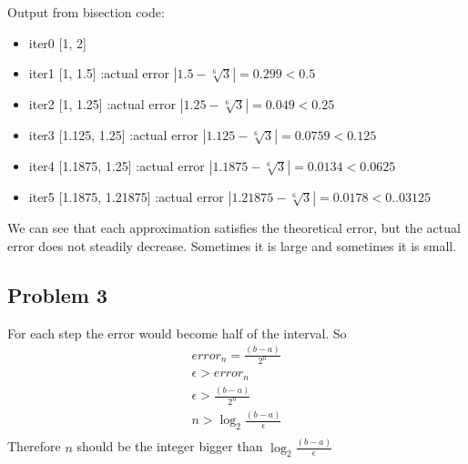 \documentclass{article}
\begin{document}
Output from bisection code: \\
\begin{itemize}
\item iter0 [1,	2] \\
\item iter1 [1,	1.5]   		:actual error $ |1.5-\sqrt[6]{3}|=0.299< 0.5$ \\
\item iter2 [1,	1.25]			:actual error $ |1.25-\sqrt[6]{3}|=0.049< 0.25$ \\
\item iter3 [1.125,	1.25]		:actual error $ |1.125-\sqrt[6]{3}|=0.0759< 0.125$ \\
\item iter4 [1.1875,	1.25]		:actual error $ |1.1875-\sqrt[6]{3}|=0.0134< 0.0625$ \\
\item iter5 [1.1875,	1.21875]	:actual error $ |1.21875-\sqrt[6]{3}|=0.0178< 0..03125$ \\
\end{itemize}
We can see that each approximation satisfies the theoretical error, but the actual error does not steadily decrease. Sometimes it is large and sometimes it is small. \\

\hypertarget{problem_3_homework_checklist_2}{}
\subsection*{{Problem 3}}
\label{problem_0_homework_checklist_2}
For each step the error would become half of the interval. So 
\begin{align} 
error_n = \frac{(b-a)}{2^n}\\
\epsilon > error_n\\
\epsilon >  \frac{(b-a)}{2^n}\\
n>\log_2 \frac{(b-a)}{\epsilon}\\
\end{align}
Therefore $n$ should be the integer bigger than $\log_2 \frac{(b-a)}{\epsilon}$

\hypertarget{problem_4_homework_checklist_2}{}
\end{document}
